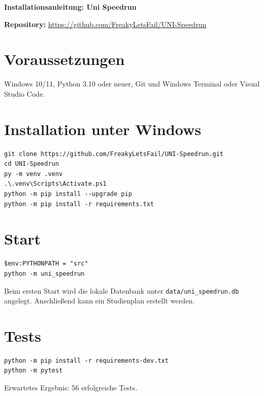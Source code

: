 \documentclass[11pt,a4paper]{article}
\begin{document}
\pagestyle{empty}

{\LARGE\bfseries Installationsanleitung: Uni Speedrun}

\textbf{Repository:} \url{https://github.com/FreakyLetsFail/UNI-Speedrun}

\section*{Voraussetzungen}
Windows 10/11, Python 3.10 oder neuer, Git und Windows Terminal oder Visual Studio Code.

\section*{Installation unter Windows}
\begin{Verbatim}
git clone https://github.com/FreakyLetsFail/UNI-Speedrun.git
cd UNI-Speedrun
py -m venv .venv
.\.venv\Scripts\Activate.ps1
python -m pip install --upgrade pip
python -m pip install -r requirements.txt
\end{Verbatim}

\section*{Start}
\begin{Verbatim}
$env:PYTHONPATH = "src"
python -m uni_speedrun
\end{Verbatim}
Beim ersten Start wird die lokale Datenbank unter \texttt{data/uni\_speedrun.db} angelegt. Anschließend kann ein Studienplan erstellt werden.

\section*{Tests}
\begin{Verbatim}
python -m pip install -r requirements-dev.txt
python -m pytest
\end{Verbatim}
Erwartetes Ergebnis: 56 erfolgreiche Tests.
\end{document}
